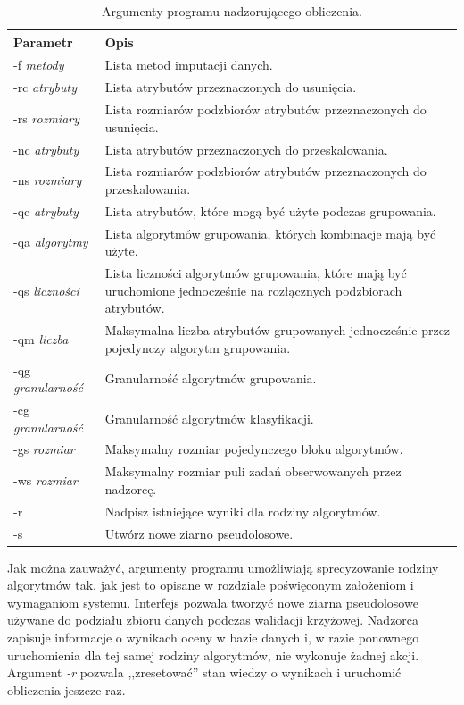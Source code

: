 \documentclass[../thesis.tex]{subfiles}
\begin{document}
\begin{table}[h]
\begin{center}
\begin{tabular}{ | l | p{110mm} | }
\hline
\rowcolor{lightgray} Parametr & Opis \\\hline

-f \emph{metody} & Lista metod imputacji danych.\\\hline
-rc \emph{atrybuty} & Lista atrybutów przeznaczonych do usunięcia.\\\hline
-rs \emph{rozmiary} & Lista rozmiarów podzbiorów atrybutów przeznaczonych do usunięcia.\\\hline
-nc \emph{atrybuty} & Lista atrybutów przeznaczonych do przeskalowania.\\\hline
-ns \emph{rozmiary} & Lista rozmiarów podzbiorów atrybutów przeznaczonych do przeskalowania.\\\hline
-qc \emph{atrybuty} & Lista atrybutów, które mogą być użyte podczas grupowania.\\\hline
-qa \emph{algorytmy} & Lista algorytmów grupowania, których kombinacje mają być użyte.\\\hline
-qs \emph{liczności} & Lista liczności algorytmów grupowania, które mają być uruchomione jednocześnie na rozłącznych podzbiorach atrybutów.\\\hline
-qm \emph{liczba} & Maksymalna liczba atrybutów grupowanych jednocześnie przez pojedynczy algorytm grupowania.\\\hline
-qg \emph{granularność} & Granularność algorytmów grupowania.\\\hline
-cg \emph{granularność} & Granularność algorytmów klasyfikacji.\\\hline
-gs \emph{rozmiar} & Maksymalny rozmiar pojedynczego bloku algorytmów.\\\hline
-ws \emph{rozmiar} & Maksymalny rozmiar puli zadań obserwowanych przez nadzorcę.\\\hline
-r & Nadpisz istniejące wyniki dla rodziny algorytmów.\\\hline
-s & Utwórz nowe ziarno pseudolosowe.\\\hline

\end{tabular}
\caption{Argumenty programu nadzorującego obliczenia.}
\label{proj:table_calculate_args}
\end{center}
\end{table}

Jak można zauważyć, argumenty programu umożliwiają sprecyzowanie rodziny algorytmów tak, jak jest to opisane w rozdziale poświęconym założeniom i wymaganiom systemu. Interfejs pozwala tworzyć nowe ziarna pseudolosowe używane do podziału zbioru danych podczas walidacji krzyżowej. Nadzorca zapisuje informacje o wynikach oceny w bazie danych i, w razie ponownego uruchomienia dla tej samej rodziny algorytmów, nie wykonuje żadnej akcji. Argument \emph{-r} pozwala ,,zresetować'' stan wiedzy o wynikach i uruchomić obliczenia jeszcze raz.
\end{document}
